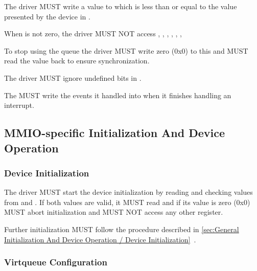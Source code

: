The driver MUST write a value to  which is less than
or equal to the value presented by the device in .

When  is not zero, the driver MUST NOT access
, , ,
, , , 

To stop using the queue the driver MUST write zero (0x0) to this
 and MUST read the value back to ensure
synchronization.

The driver MUST ignore undefined bits in .

The MUST write the events it handled into  when
it finishes handling an interrupt.

\subsection{MMIO-specific Initialization And Device Operation}\label{sec:Virtio Transport Options / Virtio Over MMIO / MMIO-specific Initialization And Device Operation}

\subsubsection{Device Initialization}\label{sec:Virtio Transport Options / Virtio Over MMIO / MMIO-specific Initialization And Device Operation / Device Initialization}


The driver MUST start the device initialization by reading and
checking values from  and .
If both values are valid, it MUST read 
and if its value is zero (0x0) MUST abort initialization and
MUST NOT access any other register.

Further initialization MUST follow the procedure described in
\ref{sec:General Initialization And Device Operation / Device Initialization}~.

\subsubsection{Virtqueue Configuration}\label{sec:Virtio Transport Options / Virtio Over MMIO / MMIO-specific Initialization And Device Operation / Virtqueue Configuration}

